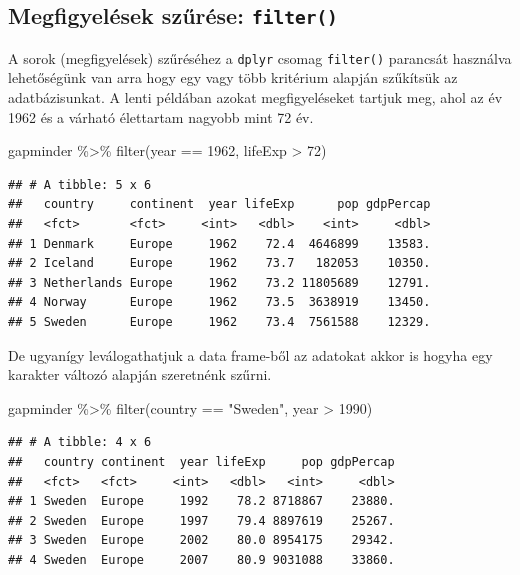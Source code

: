 \documentclass[
]{book}
\newenvironment{Shaded}{\begin{snugshade}}{\end{snugshade}}
\newcommand{\DecValTok}[1]{\textcolor[rgb]{0.00,0.00,0.81}{#1}}
\newcommand{\FunctionTok}[1]{\textcolor[rgb]{0.00,0.00,0.00}{#1}}
\newcommand{\NormalTok}[1]{#1}
\newcommand{\SpecialCharTok}[1]{\textcolor[rgb]{0.00,0.00,0.00}{#1}}
\newcommand{\StringTok}[1]{\textcolor[rgb]{0.31,0.60,0.02}{#1}}
\begin{document}
\hypertarget{megfigyeluxe9sek-szux171ruxe9se-filter}{%
\subsection{\texorpdfstring{Megfigyelések szűrése:
\texttt{filter()}}{Megfigyelések szűrése: filter()}}\label{megfigyeluxe9sek-szux171ruxe9se-filter}}

A sorok (megfigyelések) szűréséhez a \texttt{dplyr} csomag
\texttt{filter()} parancsát használva lehetőségünk van arra hogy egy
vagy több kritérium alapján szűkítsük az adatbázisunkat. A lenti
példában azokat megfigyeléseket tartjuk meg, ahol az év 1962 és a
várható élettartam nagyobb mint 72 év.

\begin{Shaded}
\begin{Highlighting}[]
\NormalTok{gapminder }\SpecialCharTok{\%\textgreater{}\%}
  \FunctionTok{filter}\NormalTok{(year }\SpecialCharTok{==} \DecValTok{1962}\NormalTok{, lifeExp }\SpecialCharTok{\textgreater{}} \DecValTok{72}\NormalTok{)}
\end{Highlighting}
\end{Shaded}

\begin{verbatim}
## # A tibble: 5 x 6
##   country     continent  year lifeExp      pop gdpPercap
##   <fct>       <fct>     <int>   <dbl>    <int>     <dbl>
## 1 Denmark     Europe     1962    72.4  4646899    13583.
## 2 Iceland     Europe     1962    73.7   182053    10350.
## 3 Netherlands Europe     1962    73.2 11805689    12791.
## 4 Norway      Europe     1962    73.5  3638919    13450.
## 5 Sweden      Europe     1962    73.4  7561588    12329.
\end{verbatim}

De ugyanígy leválogathatjuk a data frame-ből az adatokat akkor is hogyha
egy karakter változó alapján szeretnénk szűrni.

\begin{Shaded}
\begin{Highlighting}[]
\NormalTok{gapminder }\SpecialCharTok{\%\textgreater{}\%}
  \FunctionTok{filter}\NormalTok{(country }\SpecialCharTok{==} \StringTok{"Sweden"}\NormalTok{, year }\SpecialCharTok{\textgreater{}} \DecValTok{1990}\NormalTok{)}
\end{Highlighting}
\end{Shaded}

\begin{verbatim}
## # A tibble: 4 x 6
##   country continent  year lifeExp     pop gdpPercap
##   <fct>   <fct>     <int>   <dbl>   <int>     <dbl>
## 1 Sweden  Europe     1992    78.2 8718867    23880.
## 2 Sweden  Europe     1997    79.4 8897619    25267.
## 3 Sweden  Europe     2002    80.0 8954175    29342.
## 4 Sweden  Europe     2007    80.9 9031088    33860.
\end{verbatim}
\end{document}
